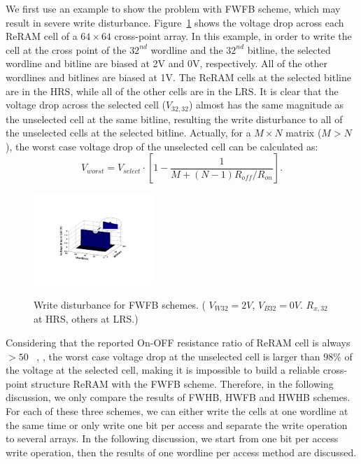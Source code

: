 We first use an example to show the problem with FWFB scheme, which may result in severe write disturbance.
Figure~\ref{fig:FWFR} shows the voltage drop across each ReRAM cell of a $64 \times 64$ cross-point array. In this example, in order to write the cell at the cross point of the $32^{nd}$ wordline and the $32^{nd}$ bitline, the selected wordline and bitline are biased at 2V and 0V, respectively. All of the other wordlines and bitlines are biased at 1V. The ReRAM cells at the selected bitline are in the HRS, while all of the other cells are in the LRS. It is clear that the voltage drop across the selected cell ($V_{32,32}$) almost has the same magnitude as the unselected cell at the same bitline, resulting the write disturbance to all of the unselected cells at the selected bitline. Actually, for a $M \times N$ matrix ($M>N$), the worst case voltage drop of the unselected cell can be calculated as:
\begin{equation}\label{worst_FWFB}
V_{worst}=V_{select} \cdot [1-\frac{1}{M+(N-1)R_{off}/R_{on}}].
\end{equation}

\begin{figure}[!b]
\centering
  \includegraphics[width=0.4\textwidth]{./figures/FWFB_f.pdf}\\
  \caption{Write disturbance for FWFB schemes. ( $V_{W32} = 2V$, $V_{B32} = 0V$. $R_{x,32}$ at HRS, others at LRS.) }\label{fig:FWFR}
\end{figure}
Considering that the reported On-OFF resistance ratio of
ReRAM cell is always $>50$ ~\cite{ReRAM_IEDM2010_Ho,ReRAM_IEDM2010_Chien,ReRAM_IEDM2010_Lee_Diode,ReRAM_IEDM2010_Lee_Evidence,ReRAM_ISSCC2011_Sheu,ReRAM_ISSCC2011_Otsuka},
, the worst case voltage drop at the unselected cell is larger than $98\%$ of the voltage at the selected cell, making it is impossible to build a reliable cross-point structure ReRAM with the FWFB scheme. Therefore, in the following discussion, we only compare the results of FWHB, HWFB and HWHB schemes. For each of these three schemes, we can either write the cells at one wordline at the same time or only write one bit per access and separate the write operation to several arrays. In the
following discussion, we start from one bit per access write operation,
then the results of one wordline per access method are discussed.



